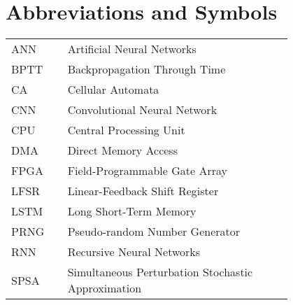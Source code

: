 \chapter*{Abbreviations and Symbols}

\begin{flushleft}
\begin{tabular}{l p{0.8\linewidth}}
ANN      & Artificial Neural Networks\\
BPTT     & Backpropagation Through Time\\
CA       & Cellular Automata\\
CNN      & Convolutional Neural Network\\
CPU      & Central Processing Unit\\
DMA      & Direct Memory Access\\
FPGA     & Field-Programmable Gate Array\\
LFSR     & Linear-Feedback Shift Register\\
LSTM     & Long Short-Term Memory\\
PRNG     & Pseudo-random Number Generator\\
RNN      & Recursive Neural Networks\\
SPSA     & Simultaneous Perturbation Stochastic Approximation\\
\end{tabular}
\end{flushleft}
